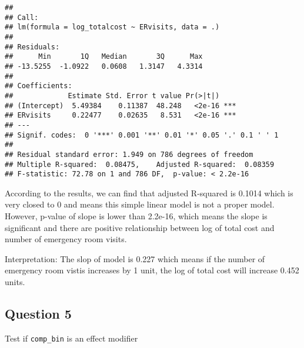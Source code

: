 \documentclass[]{article}
\newenvironment{Shaded}{\begin{snugshade}}{\end{snugshade}}
\newcommand{\KeywordTok}[1]{\textcolor[rgb]{0.13,0.29,0.53}{\textbf{#1}}}
\newcommand{\DataTypeTok}[1]{\textcolor[rgb]{0.13,0.29,0.53}{#1}}
\newcommand{\StringTok}[1]{\textcolor[rgb]{0.31,0.60,0.02}{#1}}
\newcommand{\CommentTok}[1]{\textcolor[rgb]{0.56,0.35,0.01}{\textit{#1}}}
\newcommand{\OperatorTok}[1]{\textcolor[rgb]{0.81,0.36,0.00}{\textbf{#1}}}
\newcommand{\NormalTok}[1]{#1}
\begin{document}
\begin{verbatim}
## 
## Call:
## lm(formula = log_totalcost ~ ERvisits, data = .)
## 
## Residuals:
##      Min       1Q   Median       3Q      Max 
## -13.5255  -1.0922   0.0608   1.3147   4.3314 
## 
## Coefficients:
##             Estimate Std. Error t value Pr(>|t|)    
## (Intercept)  5.49384    0.11387  48.248   <2e-16 ***
## ERvisits     0.22477    0.02635   8.531   <2e-16 ***
## ---
## Signif. codes:  0 '***' 0.001 '**' 0.01 '*' 0.05 '.' 0.1 ' ' 1
## 
## Residual standard error: 1.949 on 786 degrees of freedom
## Multiple R-squared:  0.08475,    Adjusted R-squared:  0.08359 
## F-statistic: 72.78 on 1 and 786 DF,  p-value: < 2.2e-16
\end{verbatim}

According to the results, we can find that adjusted R-squared is 0.1014
which is very closed to 0 and means this simple linear model is not a
proper model. However, p-value of slope is lower than 2.2e-16, which
means the slope is significant and there are positive relationship
between log of total cost and number of emergency room visits.

Interpretation: The slop of model is 0.227 which means if the number of
emergency room vistis increases by 1 unit, the log of total cost will
increase 0.452 units.

\subsection{Question 5}\label{question-5}

Test if \texttt{comp\_bin} is an effect modifier

\begin{Shaded}
\end{Shaded}
\end{document}
